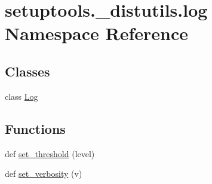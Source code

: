 \hypertarget{namespacesetuptools_1_1__distutils_1_1log}{}\section{setuptools.\+\_\+distutils.\+log Namespace Reference}
\label{namespacesetuptools_1_1__distutils_1_1log}
\subsection*{Classes}
\begin{DoxyCompactItemize}
\item 
class \hyperlink{classsetuptools_1_1__distutils_1_1log_1_1Log}{Log}
\end{DoxyCompactItemize}
\subsection*{Functions}
\begin{DoxyCompactItemize}
\item 
def \hyperlink{namespacesetuptools_1_1__distutils_1_1log_a4e8da2b4bd1db5040a7f283fa429f6a7}{set\+\_\+threshold} (level)
\item 
def \hyperlink{namespacesetuptools_1_1__distutils_1_1log_a02d6137b629bb1630f16470d4f6f5be1}{set\+\_\+verbosity} (v)
\end{DoxyCompactItemize}
